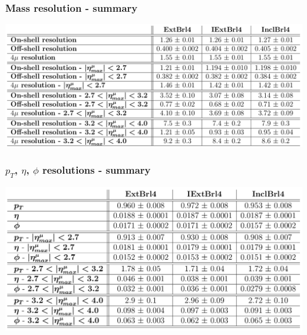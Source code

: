 \documentclass{beamer}
\begin{document}
\begin{frame}
\frametitle{Mass resolution - summary}
\centering
\includegraphics[width=\textwidth]{HZZ4mu/massResolutions}


\end{frame}


\begin{frame}
\frametitle{$p_T$, $\eta$, $\phi$ resolutions - summary}
\centering
\includegraphics[width=\textwidth]{HZZ4mu/ptResolutions}
\end{frame}
\end{document}
